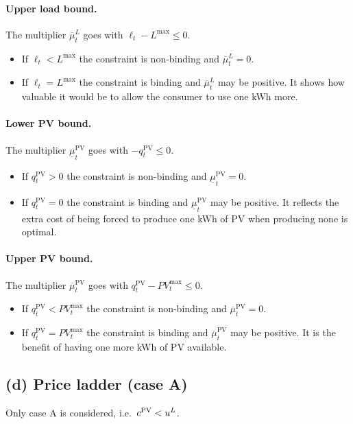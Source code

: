 \paragraph{Upper load bound.}
The multiplier $\overline{\mu}_t^L$ goes with $\ell_t-L^{\max}\leq 0$.
\begin{itemize}
    \item If $\ell_t<L^{\max}$ the constraint is non-binding and
    $\overline{\mu}_t^L=0$.
    \item If $\ell_t=L^{\max}$ the constraint is binding and $\overline{\mu}_t^L$ may be
    positive. It shows how valuable it would be to allow the consumer to use one kWh more.
\end{itemize}

\paragraph{Lower PV bound.}
The multiplier $\underline{\mu}_t^{\mathrm{PV}}$ goes with $-q_t^{\mathrm{PV}}\leq 0$.
\begin{itemize}
    \item If $q_t^{\mathrm{PV}}>0$ the constraint is non-binding and
    $\underline{\mu}_t^{\mathrm{PV}}=0$.
    \item If $q_t^{\mathrm{PV}}=0$ the constraint is binding and
    $\underline{\mu}_t^{\mathrm{PV}}$ may be positive. It reflects the extra cost of being
    forced to produce one kWh of PV when producing none is optimal.
\end{itemize}

\paragraph{Upper PV bound.}
The multiplier $\overline{\mu}_t^{\mathrm{PV}}$ goes with
$q_t^{\mathrm{PV}}-PV_t^{\max}\leq 0$.
\begin{itemize}
    \item If $q_t^{\mathrm{PV}}<PV_t^{\max}$ the constraint is non-binding and
    $\overline{\mu}_t^{\mathrm{PV}}=0$.
    \item If $q_t^{\mathrm{PV}}=PV_t^{\max}$ the constraint is binding and
    $\overline{\mu}_t^{\mathrm{PV}}$ may be positive. It is the benefit of having one more
    kWh of PV available.
\end{itemize}

\subsection{(d) Price ladder (case A)}
Only case A is considered, i.e.\ $c^{\mathrm{PV}} < u^{L}$.

